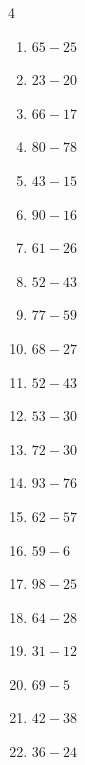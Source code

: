 \begin{multicols}{4}
\begin{enumerate}
  \item $65-25$
        \phantom{$=40$}

  \item $23-20$
        \phantom{$=3$}

  \item $66-17$
        \phantom{$=49$}

  \item $80-78$
        \phantom{$=2$}

  \item $43-15$
        \phantom{$=28$}

  \item $90-16$
        \phantom{$=74$}

  \item $61-26$
        \phantom{$=35$}

  \item $52-43$
        \phantom{$=9$}

  \item $77-59$
        \phantom{$=18$}

  \item $68-27$
        \phantom{$=41$}

  \item $52-43$
        \phantom{$=9$}

  \item $53-30$
        \phantom{$=23$}

  \item $72-30$
        \phantom{$=42$}

  \item $93-76$
        \phantom{$=17$}

  \item $62-57$
        \phantom{$=5$}

  \item $59-6$
        \phantom{$=53$}

  \item $98-25$
        \phantom{$=73$}

  \item $64-28$
        \phantom{$=36$}

  \item $31-12$
        \phantom{$=19$}

  \item $69-5$
        \phantom{$=64$}

  \item $42-38$
        \phantom{$=4$}

  \item $36-24$
        \phantom{$=12$}


\end{enumerate}
\end{multicols}
